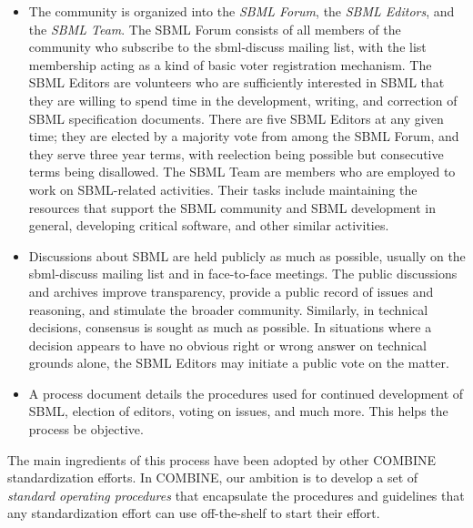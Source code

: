\vspace*{-1em}
\begin{itemize}

\item The community is organized into the \emph{SBML Forum}, the \emph{SBML Editors}, and the \emph{SBML Team}. The SBML Forum consists of all members of the community who subscribe to the sbml-discuss mailing list, with the list membership acting as a kind of basic voter registration mechanism.  The SBML Editors are volunteers who are sufficiently interested in SBML that they are willing to spend time in the development, writing, and correction of SBML specification documents.  There are five SBML Editors at any given time; they are elected by a majority vote from among the SBML Forum, and they serve three year terms, with reelection being possible but consecutive terms being disallowed.  The SBML Team are members who are employed to work on SBML-related activities.  Their tasks include maintaining the resources that support the SBML community and SBML development in general, developing critical software, and other similar activities.
 
\item Discussions about SBML are held publicly as much as possible, usually on the sbml-discuss mailing list and in face-to-face meetings.  The public discussions and archives improve transparency, provide a public record of issues and reasoning, and stimulate the broader community.  Similarly, in technical decisions, consensus is sought as much as possible. In situations where a decision appears to have no obvious right or wrong answer on technical grounds alone, the SBML Editors may initiate a public vote on the matter.

\item A process document details the procedures used for continued development of SBML, election of editors, voting on issues, and much more.  This helps the process be objective.

\end{itemize}
\vspace*{-1em}

The main ingredients of this process have been adopted by other COMBINE standardization efforts.  In COMBINE, our ambition is to develop a set of \emph{standard operating procedures} that encapsulate the procedures and guidelines that any standardization effort can use off-the-shelf to start their effort.






